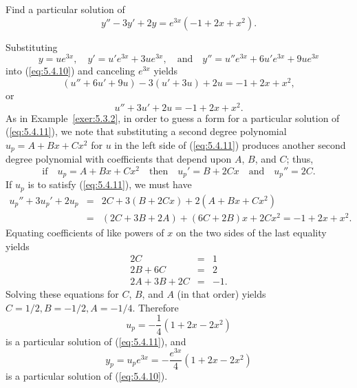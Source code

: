 \documentclass{ximera}
\begin{document}
\begin{example}\label{example:5.4.4}
Find a particular solution of
\begin{equation} \label{eq:5.4.10}
y''-3y'+2y=e^{3x}(-1+2x+x^2).
\end{equation}

\begin{explanation}
Substituting
$$
y=ue^{3x},\quad y'=u'e^{3x}+3ue^{3x},\quad\mbox{and}\quad
y''=u''e^{3x}+6u'e^{3x}+9ue^{3x}
$$
into (\ref{eq:5.4.10}) and  canceling $e^{3x}$  yields
$$
(u''+6u'+9u)-3(u'+3u)+2u=-1+2x+x^2,
$$
or
\begin{equation} \label{eq:5.4.11}
u''+3u'+2u=-1+2x+x^2.
\end{equation}
As in Example~\ref{exer:5.3.2}, in order to guess a form for a particular
solution of
(\ref{eq:5.4.11}), we note that substituting a second degree polynomial
$u_p=A+Bx+Cx^2$ for $u$ in the left side of (\ref{eq:5.4.11}) produces
another second degree polynomial with coefficients that depend upon
$A$, $B$, and $C$;   thus,
$$
\mbox{if}\quad u_p=A+Bx+Cx^2\quad\mbox{then}\quad
u_p'=B+2Cx\quad\mbox{and}\quad u_p''=2C.
$$
If $u_p$ is to satisfy (\ref{eq:5.4.11}),  we must have
\begin{eqnarray*}
u_p''+3u_p'+2u_p&=&2C+3(B+2Cx)+2(A+Bx+Cx^2)\\
&=&(2C+3B+2A)+(6C+2B)x+2Cx^2=-1+2x+x^2.
\end{eqnarray*}
Equating  coefficients of like powers of $x$ on the two sides of the
last equality yields
$$
\begin{array}{rcr}
2C&=&1\\
2B+6C&=&2\\
2A+3B+2C&=& -1.
\end{array}
$$
Solving these equations for $C$, $B$, and $A$ (in that order) yields
 $C=1/2,B=-1/2,A=-1/4$.  Therefore
$$
u_p=-\frac{1}{4}(1+2x-2x^2)
$$
is a particular solution of  (\ref{eq:5.4.11}), and
$$
y_p=u_pe^{3x}=-\frac{e^{3x}}{4}(1+2x-2x^2)
$$
is a particular solution of  (\ref{eq:5.4.10}).
\end{explanation}
\end{example}
\end{document}
